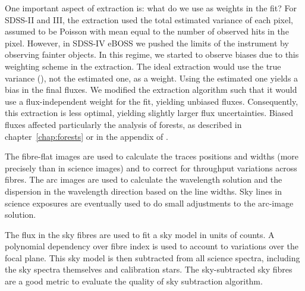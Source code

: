 One important aspect of extraction is: what do we use as weights in the fit?
For SDSS-II and III, the extraction used the total estimated variance of each pixel,
assumed to be Poisson with mean equal to the number of observed hits in the pixel. 
However, in SDSS-IV eBOSS we pushed the limits of the instrument by observing fainter
objects. In this regime, we started to observe biases due to this weighting scheme in 
the extraction. The ideal extraction would use the true variance 
(\cite{horneOptimalExtractionAlgorithm1986}), not the estimated
one, as a weight. Using the estimated one yields a bias in the final fluxes. 
We modified the extraction algorithm such that it would use a flux-independent weight 
for the fit, yielding unbiased fluxes. Consequently, this extraction is less 
optimal, yielding slightly larger flux uncertainties. Biased fluxes affected 
particularly the analysis of \lya forests, as described in chapter~\ref{chap:forests}
or in the appendix of \cite{bautistaMeasurementBaryonAcoustic2017}.

The fibre-flat images are used to calculate the traces positions and widths 
(more precisely than in science images) 
and to correct for throughput variations across fibres. 
The arc images are used to calculate the wavelength solution and 
the dispersion in the wavelength direction based on the line widths. 
Sky lines in science exposures are eventually used to do small adjustments 
to the arc-image solution. 

The flux in the sky fibres are used to fit a sky model in units of counts.
A polynomial dependency over fibre index is used to account to variations 
over the focal plane. This sky model is then subtracted from all science 
spectra, including the sky spectra themselves and calibration stars. 
The sky-subtracted sky fibres are a good metric to evaluate the quality of 
sky subtraction algorithm. 

